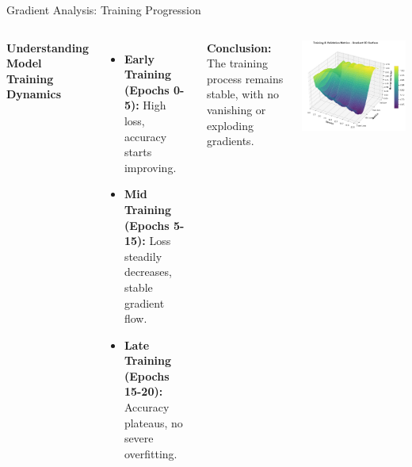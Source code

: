 \begin{frame}{Gradient Analysis: Training Progression}

    \begin{columns}

        \textbf{Understanding Model Training Dynamics}
        \vspace{10pt}

      \begin{itemize}
            \item \textbf{Early Training (Epochs 0-5):} High loss, accuracy starts improving.
            \item \textbf{Mid Training (Epochs 5-15):} Loss steadily decreases, stable gradient flow.
            \item \textbf{Late Training (Epochs 15-20):} Accuracy plateaus, no severe overfitting.
        \end{itemize}

          \textbf{Conclusion:} The training process remains stable, with no vanishing or exploding gradients. 


        \centering
        \includegraphics[width=0.9\linewidth]{images/paper_3/3d gradient.png} %

    \end{columns}

\end{frame}





